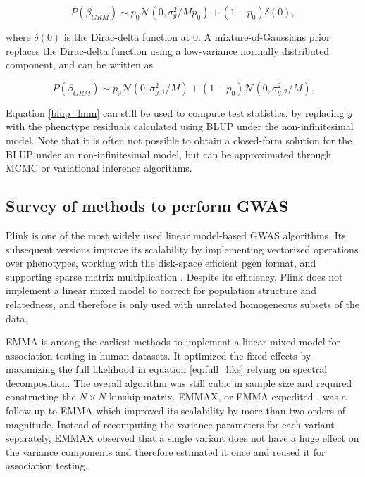 \begin{equation}
P(\beta_{GRM}) \sim p_0 \mathcal{N} (0, \sigma_g^2/Mp_0) + (1-p_0) \delta(0),
\end{equation}

where $\delta(0)$ is the Dirac-delta function at $0$.
%
A mixture-of-Gaussians prior replaces the Dirac-delta function using a low-variance normally distributed component, and can be written as

\begin{equation}
P(\beta_{GRM}) \sim p_0 \mathcal{N} (0, \sigma_{g,1}^2/M) + (1-p_0) \mathcal{N} (0, \sigma_{g,2}^2/M).
\end{equation}

%

%
Equation \ref{blup_lmm} can still be used to compute test statistics, by replacing $\tilde{y}$ with the phenotype residuals calculated using BLUP under the non-infinitesimal model.
%
Note that it is often not possible to obtain a closed-form solution for the BLUP under an non-infinitesimal model, but can be approximated through MCMC or variational inference algorithms.

\subsection{Survey of methods to perform GWAS}

Plink \cite{purcell2007plink} is one of the most widely used linear model-based GWAS algorithms. Its subsequent versions \cite{chang2015second} improve its scalability by implementing vectorized operations over phenotypes, working with the disk-space efficient pgen format, and supporting sparse matrix multiplication \cite{rivas2024efficient}. Despite its efficiency, Plink does not implement a linear mixed model to correct for population structure and relatedness, and therefore is only used with unrelated homogeneous subsets of the data.

EMMA \cite{kang2008efficient} is among the earliest methods to implement a linear mixed model for association testing in human datasets. It optimized the fixed effects by maximizing the full likelihood in equation \ref{eq:full_like} relying on spectral decomposition. The overall algorithm was still cubic in sample size and required constructing the \(N \times N\) kinship matrix. EMMAX, or EMMA expedited \cite{kang2010variance}, was a follow-up to EMMA which improved its scalability by more than two orders of magnitude. Instead of recomputing the variance parameters for each variant separately, EMMAX observed that a single variant does not have a huge effect on the variance components and therefore estimated it once and reused it for association testing.

